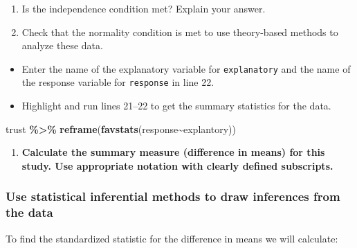 \documentclass[
]{report}
\newenvironment{Shaded}{\begin{snugshade}}{\end{snugshade}}
\newcommand{\FunctionTok}[1]{\textcolor[rgb]{0.13,0.29,0.53}{\textbf{#1}}}
\newcommand{\NormalTok}[1]{#1}
\newcommand{\SpecialCharTok}[1]{\textcolor[rgb]{0.81,0.36,0.00}{\textbf{#1}}}
\providecommand{\tightlist}{%
  \setlength{\itemsep}{0pt}\setlength{\parskip}{0pt}}
\begin{document}
\begin{enumerate}
\def\labelenumi{\arabic{enumi}.}
\setcounter{enumi}{3}
\item
  Is the independence condition met? Explain your answer.
  \vspace{0.8in}
\item
  Check that the normality condition is met to use theory-based methods to analyze these data.
\end{enumerate}

\vspace{0.8in}

\begin{itemize}
\item
  Enter the name of the explanatory variable for \texttt{explanatory} and the name of the response variable for \texttt{response} in line 22.
\item
  Highlight and run lines 21--22 to get the summary statistics for the data.
\end{itemize}

\begin{Shaded}
\begin{Highlighting}[]
\NormalTok{trust }\SpecialCharTok{\%\textgreater{}\%}
  \FunctionTok{reframe}\NormalTok{(}\FunctionTok{favstats}\NormalTok{(response}\SpecialCharTok{\textasciitilde{}}\NormalTok{explantory))}
\end{Highlighting}
\end{Shaded}

\begin{enumerate}
\def\labelenumi{\arabic{enumi}.}
\setcounter{enumi}{5}
\tightlist
\item
  \textbf{Calculate the summary measure (difference in means) for this study. Use appropriate notation with clearly defined subscripts.}
\end{enumerate}

\vspace{1in}

\subsubsection*{Use statistical inferential methods to draw inferences from the data}\label{use-statistical-inferential-methods-to-draw-inferences-from-the-data-5}

To find the standardized statistic for the difference in means we will calculate:
\end{document}
